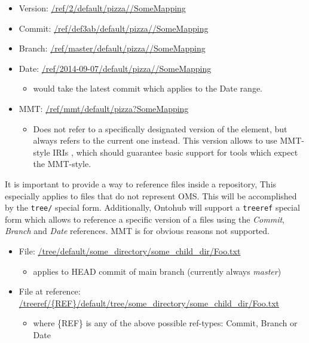 \documentclass[10pt, a4paper]{isov2}
\begin{document}
 \begin{itemize} 
  \item Version: \url{/ref/2/default/pizza//SomeMapping}
  \item Commit: \url{/ref/def3ab/default/pizza//SomeMapping}
  \item Branch: \url{/ref/master/default/pizza//SomeMapping}
  \item Date: \url{/ref/2014-09-07/default/pizza//SomeMapping}
     \begin{itemize} 
      \item would take the latest commit which applies to the Date range.
     \end{itemize} 
  \item MMT: \url{/ref/mmt/default/pizza?SomeMapping}
     \begin{itemize} 
      \item Does not refer to a specifically designated version of the element,
        but always refers to the current one instead. This version allows to
        use MMT-style IRIs \cite{RabKoh:WSMSML13}, 
        which should guarantee basic support for tools
        which expect the MMT-style.
     \end{itemize} 
 \end{itemize} 



 It is important to provide a way to reference files inside a repository,
This especially applies to files that do not represent OMS. This
will be accomplished by the \texttt{tree/} special form. Additionally,
 Ontohub will support a \texttt{treeref} special form which allows to reference
a specific version of a files using the \emph{Commit}, \emph{Branch} and
\emph{Date} references. MMT is for obvious reasons not supported.

 \begin{itemize} 
  \item File: \url{/tree/default/some_directory/some_child_dir/Foo.txt}
     \begin{itemize} 
      \item applies to HEAD commit of main branch (currently always \emph{master})
     \end{itemize} 
  \item File at reference: \url{/treeref/{REF}/default/tree/some_directory/some_child_dir/Foo.txt}
     \begin{itemize} 
      \item where \{REF\} is any of the above possible ref-types: Commit, Branch or Date
     \end{itemize} 
 \end{itemize} 
\end{document}
